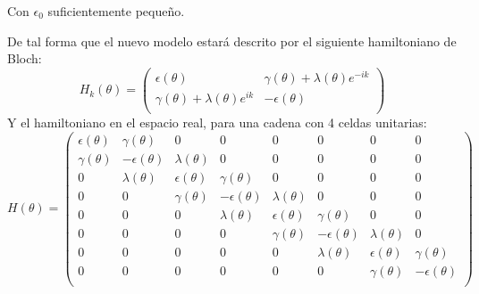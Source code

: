 Con $\epsilon_0$ suficientemente pequeño.

De tal forma que el nuevo modelo estará descrito por el siguiente hamiltoniano de Bloch:
\begin{equation}
    H_k(\theta) =      
     \begin{pmatrix}
            \epsilon(\theta) & \gamma(\theta) + \lambda(\theta) e^{-ik}  \\
            \gamma(\theta) + \lambda(\theta) e^{ik} & -\epsilon(\theta) \\
        \end{pmatrix} 
\end{equation}
Y el hamiltoniano en el espacio real, para una cadena con 4 celdas unitarias:
\begin{equation}
    H (\theta)= 
     \begin{pmatrix}
            \epsilon(\theta) & \gamma(\theta) & 0 & 0 & 0 & 0 & 0 & 0 \\
            \gamma(\theta) & -\epsilon(\theta) & \lambda(\theta) & 0 & 0 & 0 & 0 & 0 \\
            0 & \lambda(\theta) & \epsilon(\theta) & \gamma(\theta) & 0 & 0 & 0 & 0 \\
            0 & 0 & \gamma(\theta) & -\epsilon(\theta) & \lambda(\theta) & 0 & 0 & 0 \\
            0 & 0 & 0 & \lambda(\theta) & \epsilon(\theta) & \gamma(\theta) & 0 & 0 \\
            0 & 0 & 0 & 0 & \gamma(\theta) & -\epsilon(\theta) & \lambda(\theta) & 0 \\
            0 & 0 & 0 & 0 & 0 & \lambda(\theta) & \epsilon(\theta) & \gamma(\theta) \\
            0 & 0 & 0 & 0 & 0 & 0 & \gamma(\theta) & -\epsilon(\theta) \\
            
        \end{pmatrix}
\end{equation}

